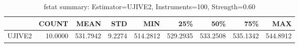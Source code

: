 \begin{table}[ht]
\centering
\caption{fstat summary: Estimator=UJIVE2, Instruments=100, Strength=0.60}
\begin{tabular}{lrrrrrrrr}
\toprule
 & COUNT & MEAN & STD & MIN & 25\% & 50\% & 75\% & MAX \\
\midrule
UJIVE2 & 10.0000 & 531.7942 & 9.2274 & 514.2812 & 529.2935 & 533.2508 & 535.1342 & 544.8912 \\
\bottomrule
\end{tabular}
\end{table}
